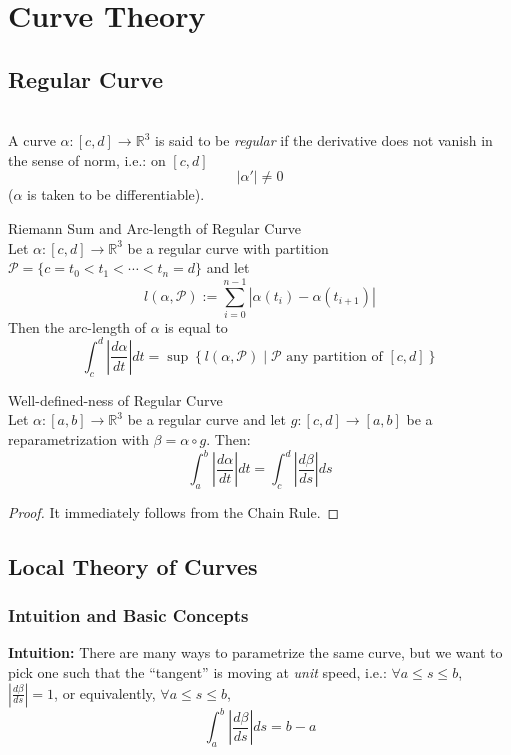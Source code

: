 \chapter{Curve Theory}

\section{Regular Curve}

\\
A curve $\alpha:[c,d]\to\mathbb{R}^3$ is said to be \textit{regular} if the derivative does not vanish in the sense of norm, i.e.: on $[c,d]$
\[
|\alpha'| \neq 0
\]
($\alpha$ is taken to be differentiable).

\begin{proposition}{Riemann Sum and Arc-length of Regular Curve}\\
Let $\alpha:[c,d]\to\mathbb{R}^3$ be a regular curve with partition $\mathcal{P}=\{c=t_0<t_1<\cdots<t_n=d\}$ and let 
\[
l(\alpha,\mathcal{P}):=\sum_{i=0}^{n-1}|\alpha(t_i)-\alpha(t_{i+1})|
\]
Then the arc-length of $\alpha$ is equal to
\[
\int_c^d\left|\frac{d\alpha}{dt}\right| dt = \sup\left\{l(\alpha,\mathcal{P})\mid\mathcal{P}\text{ any partition of }[c,d]\right\}
\]
\end{proposition}

\begin{proposition}{Well-defined-ness of Regular Curve}\\
Let $\alpha:[a,b]\to\mathbb{R}^3$ be a regular curve and let $g:[c,d]\to[a,b]$ be a reparametrization with $\beta=\alpha\circ g$. Then:
\[
\int_a^b\left|\frac{d\alpha}{dt}\right| dt = \int_c^d\left|\frac{d\beta}{ds}\right| ds
\]
\end{proposition}

\begin{proof} 
It immediately follows from the Chain Rule.
\end{proof}

\section{Local Theory of Curves}

\subsection{Intuition and Basic Concepts}


\noindent\textbf{Intuition:} There are many ways to parametrize the same curve, but we want to pick one such that the ``tangent'' is moving at \textit{unit} speed, i.e.: $\forall a\le s\le b$, $|\frac{d\beta}{ds}|=1$, or equivalently, $\forall a\le s\le b$,
\[
\int_a^b\left|\frac{d\beta}{ds}\right| ds = b - a
\]

